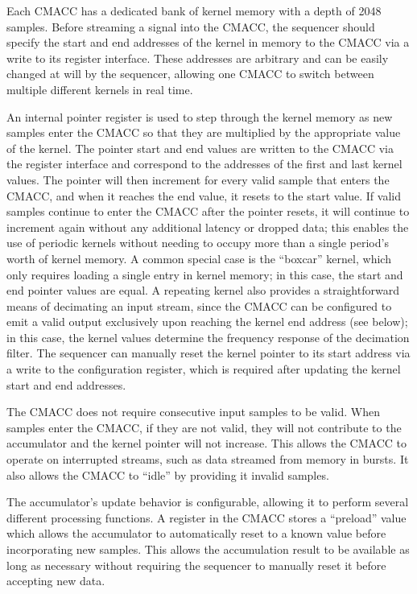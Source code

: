Each CMACC has a dedicated bank of kernel memory with a depth of 2048 samples. Before streaming a signal into the CMACC, the sequencer should specify the start and end addresses of the kernel in memory to the CMACC via a write to its register interface. These addresses are arbitrary and can be easily changed at will by the sequencer, allowing one CMACC to switch between multiple different kernels in real time.

An internal pointer register is used to step through the kernel memory as new samples enter the CMACC so that they are multiplied by the appropriate value of the kernel. The pointer start and end values are written to the CMACC via the register interface and correspond to the addresses of the first and last kernel values. The pointer will then increment for every valid sample that enters the CMACC, and when it reaches the end value, it resets to the start value. If valid samples continue to enter the CMACC after the pointer resets, it will continue to increment again without any additional latency or dropped data; this enables the use of periodic kernels without needing to occupy more than a single period's worth of kernel memory. A common special case is the ``boxcar'' kernel, which only requires loading a single entry in kernel memory; in this case, the start and end pointer values are equal. A repeating kernel also provides a straightforward means of decimating an input stream, since the CMACC can be configured to emit a valid output exclusively upon reaching the kernel end address (see below); in this case, the kernel values determine the frequency response of the decimation filter. The sequencer can manually reset the kernel pointer to its start address via a write to the configuration register, which is required after updating the kernel start and end addresses.

The CMACC does not require consecutive input samples to be valid. When samples enter the CMACC, if they are not valid, they will not contribute to the accumulator and the kernel pointer will not increase. This allows the CMACC to operate on interrupted streams, such as data streamed from memory in bursts. It also allows the CMACC to ``idle'' by providing it invalid samples.

The accumulator's update behavior is configurable, allowing it to perform several different processing functions. A register in the CMACC stores a ``preload'' value which allows the accumulator to automatically reset to a known value before incorporating new samples. This allows the accumulation result to be available as long as necessary without requiring the sequencer to manually reset it before accepting new data.

